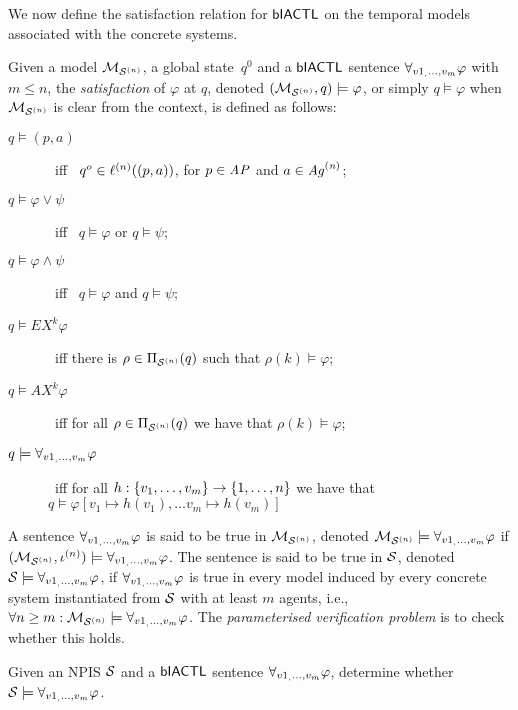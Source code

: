 We now define the satisfaction relation for $\sf{bIACTL}$ on the temporal models
associated with the concrete systems.

\begin{definition}[Satisfaction]
  \label{def:sat} 
  Given a model $\mathcal{M}_{\mathcal{S}^{(n)}}$, a global state~$q^0$ and a $\sf{bIACTL}$ sentence
  $\forall_{v1_,\ldots,v_m} \varphi$ with $m \leq n$, the \emph{satisfaction} of $\varphi$ at $q$,
  denoted $(\mathcal{M}_{\mathcal{S}^{(n)}}, q) \models\varphi$, or simply $q \models \varphi$ when
  $\mathcal{M}_{\mathcal{S}^{(n)}}$ is clear from the context, is defined as follows:
  \begin{description}
  \item[$q \models (p, a)$] \ iff \ $q^o \in \ell^{(n)}((p, a))$, for $p \in
  \it{AP}$ and $a \in \it{Ag}^{(n)}$; 
  \item[$q \models \varphi \lor \psi$] \ iff \ $q \models \varphi$ or $q \models
  \psi$;
  \item[$q \models \varphi \land \psi$] \ iff \ $q \models \varphi$ and $q
  \models \psi$;
  \item[$q \models EX^k  \varphi$] \ iff  there is $\rho \in \Pi_{\mathcal{S}^{(n)}}(q)$ such
  that $\rho(k) \models \varphi$;
  \item[$q \models AX^k  \varphi$] \ iff for all $\rho \in \Pi_{\mathcal{S}^{(n)}}(q)$ we
  have that $\rho(k) \models \varphi$;
  \item[$q \models \forall_{v1_,\ldots,v_m} \varphi$] \ iff for all $h : \left \{ v_1, \ldots, v_m \right \}
  \rightarrow \left \{ {1}, \ldots,{n} \right \}$ we have that $q \models 
  \varphi[v_1 \mapsto h(v_1), \ldots v_m \mapsto h(v_m)]$
\end{description}
\end{definition}

A sentence $\forall_{v1_,\ldots,v_m} \varphi$ is said to be true in $\mathcal{M}_{\mathcal{S}^{(n)}}$, denoted $\mathcal{M}_{\mathcal{S}^{(n)}}
\models \forall_{v1_,\ldots,v_m} \varphi$ if $(\mathcal{M}_{\mathcal{S}^{(n)}}, \iota^{({n})}) \models \forall_{v1_,\ldots,v_m} \varphi$. The
sentence is said to be true in $\mathcal{S}$, denoted $\mathcal{S} \models \forall_{v1_,\ldots,v_m} \varphi$, if
$\forall_{v1_,\ldots,v_m} \varphi$ is true in every model induced by every concrete system
instantiated from $\mathcal{S}$ with at least $m$ agents, i.e., $\forall n \geq m :
\mathcal{M}_{\mathcal{S}^{(n)}} \models \forall_{v1_,\ldots,v_m} \varphi$.  The {\em parameterised verification problem} is to
check whether this holds.


\begin{definition}
  Given an NPIS $\mathcal{S}$ and a $\sf{bIACTL}$ sentence $\forall_{v1_,\ldots,v_m} \varphi$, determine whether
  $\mathcal{S} \models \forall_{v1_,\ldots,v_m} \varphi$.
\end{definition}

